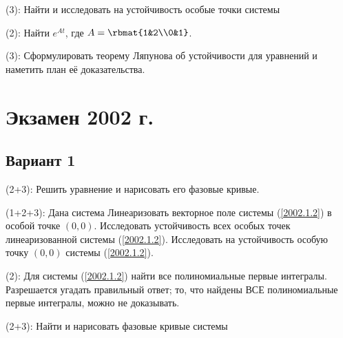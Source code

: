 \documentclass[a4paper]{article}
\newcommand{\skill}[1]{\textsf{(#1):}}
\begin{document}
\begin{problem}
\skill{3}
Найти и исследовать на устойчивость особые точки системы
\end{problem}

\begin{problem}
\skill{2}
Найти $e^{At}$, где $A = \rbmat{1&2\\0&1}$.
\end{problem}

\begin{problem}
\skill{3} Сформулировать теорему Ляпунова об устойчивости для уравнений и наметить план её доказательства.
\end{problem}

\section{Экзамен 2002 г.}

\subsection{Вариант 1}

\begin{problem}
\skill{2+3} Решить уравнение
и нарисовать его фазовые кривые.
\end{problem}

\begin{problem}
\skill{1+2+3}
Дана система
Линеаризовать векторное поле системы (\ref{2002.1.2}) в особой точке $(0,0)$.
Исследовать устойчивость всех особых точек линеаризованной системы (\ref{2002.1.2}).
Исследовать на устойчивость особую точку $(0,0)$ системы (\ref{2002.1.2}).
\end{problem}

\begin{problem}
\skill{2} Для системы (\ref{2002.1.2}) найти все полиномиальные первые интегралы. Разрешается угадать
правильный ответ; то, что найдены ВСЕ полиномиальные первые интегралы, можно не доказывать.
\end{problem}

\begin{problem}
\skill{2+3} Найти и нарисовать фазовые кривые системы
\end{problem}
\end{document}
